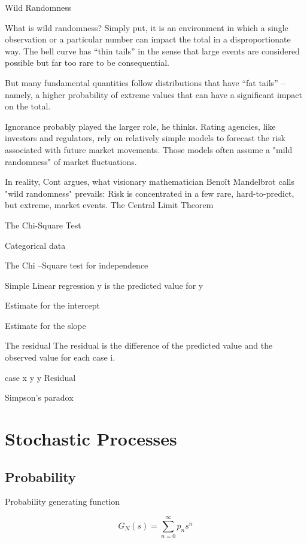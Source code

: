 Wild Randomness

What is wild randomness? Simply put, it is an environment in which a single observation or a particular number can impact the total in a disproportionate way. The bell curve has “thin tails” in the sense that large events are considered possible but far too rare to be consequential. 

But many fundamental quantities follow distributions that have “fat tails” – namely, a higher probability of extreme values that can have a significant impact on the total.

Ignorance probably played the larger role, he thinks. Rating agencies, like investors and regulators, rely on relatively simple models to forecast the risk associated with future market movements. Those models often assume a "mild randomness" of market fluctuations. 

In reality, Cont argues, what visionary mathematician Benoît Mandelbrot calls "wild randomness" prevails: Risk is concentrated in a few rare, hard-to-predict, but extreme, market events.
The Central Limit Theorem




The Chi-Square Test
 
Categorical data
 
The Chi –Square test for independence
 
Simple Linear regression
y is the predicted value for y 


Estimate for the intercept

Estimate for the slope

The residual
The residual is the difference of the predicted value and the observed value for each case i.

case
x
y
y
Residual



Simpson's paradox




\chapter{Stochastic Processes}

\section{Probability}

Probability generating function

\begin{equation}
G_N(s) = \sum_{n=0}^{\infty} p_{n}s^{n}
\end{equation}

